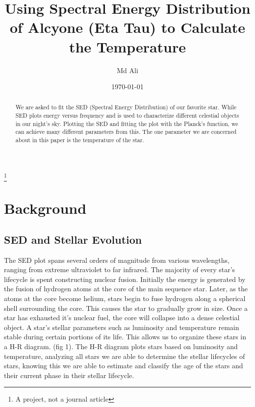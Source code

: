 \documentclass[%
 reprint,
 amsmath,amssymb,
 aps,
]{revtex4-1}
\begin{document}

\title{Using Spectral Energy Distribution of Alcyone (Eta Tau) to Calculate the Temperature  }%
\thanks{A project, not a journal article}%

\author{Md Ali}
%


\date{\today}%

\begin{abstract}
We are asked to fit the SED (Spectral Energy Distribution) of our favorite star. While SED plots energy versus frequency and is used to characterize different celestial objects in our night's sky. Plotting the SED and fitting the plot with the Planck's function, we can achieve many different parameters from this. The one parameter we are concerned about in this
paper is the temperature of the star.
\end{abstract}

\maketitle


\section{\label{sec:level1}Background}

\subsection{\label{sec:level2}SED and Stellar Evolution}

The SED plot spans several orders of magnitude from various wavelengths, ranging from extreme ultraviolet to far infrared. The majority of every star's lifecycle is spent constructing nuclear fusion. Initially the energy is generated by the fusion of hydrogen atoms at the core of the main sequence star. Later, as the atoms at the core become helium, stars begin to fuse hydrogen along a spherical shell surrounding the core. This causes the star to gradually grow in size. Once a star has exhausted it's nuclear fuel, the core will collapse into a dense celestial object. A star's stellar parameters such as luminosity and temperature remain stable during certain portions of its life. This allows us to organize these stars in a H-R diagram. (fig 1). The H-R diagram plots stars based on luminosity and temperature, analyzing all stars we are able to determine the stellar lifecycles of stars, knowing this we are able to estimate and classify the age of the stars and their current phase in their stellar lifecycle. 
\end{document}

